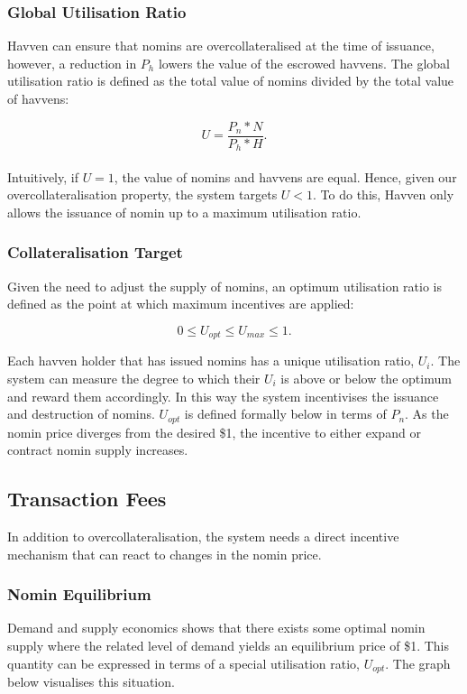 \newpage

\subsubsection{Global Utilisation Ratio}

\noindent Havven can ensure that nomins are overcollateralised at the time of issuance, however, a reduction in $P_h$ lowers the value of the escrowed havvens. The global utilisation ratio is defined as the total value of nomins divided by the total value of havvens:

$$ U = \frac{P_n * N}{P_h * H}.$$ \\

\noindent Intuitively, if $U = 1$, the value of nomins and havvens are equal. Hence, given our overcollateralisation property, the system targets $U <  1$. To do this, Havven only allows the issuance of nomin up to a maximum utilisation ratio.

\subsubsection{Collateralisation Target}

\noindent Given the need to adjust the supply of nomins, an optimum utilisation ratio is defined as the point at which maximum incentives are applied:

$$ 0 \leq U_{opt} \leq U_{max} \leq 1.$$

\noindent Each havven holder that has issued nomins has a unique utilisation ratio, $ U_i $. The system can measure the degree to which their $ U_i $ is above or below the optimum and reward them accordingly. In this way the system incentivises the issuance and destruction of nomins. $ U_{opt} $ is defined formally below in terms of $ P_n $. As  the nomin price diverges from the desired \$1, the incentive to either expand or contract nomin supply increases.

\newpage
\subsection{Transaction Fees} In addition to overcollateralisation, the system needs a direct incentive mechanism that can react to changes in the nomin price. 

\subsubsection{Nomin Equilibrium} Demand and supply economics shows that there exists some optimal nomin supply where the related level of demand yields an equilibrium price of \$1. This quantity can be expressed in terms of a special utilisation ratio, $U_{opt}$. The graph below visualises this situation. \\

